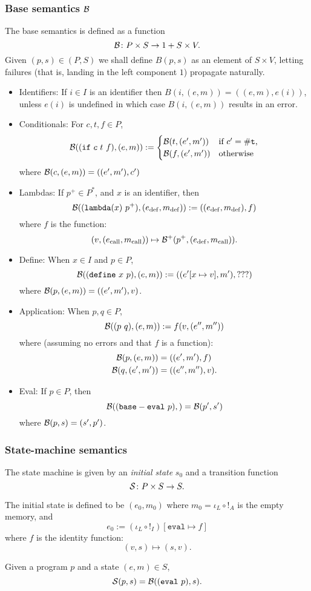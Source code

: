 \subsubsection{Base semantics $\B$}

The base semantics is defined as a function
\[
\B \colon P \times S \to 1 + S \times V.
\]
Given $(p,s) \in (P,S)$ we shall define $B(p,s)$ as an element of $S \times V$,
letting failures (that is, landing in the left component $1$) propagate
naturally.
\begin{itemize}
\item Identifiers: If $i \in I$ is an identifier then $B(i,(e,m)) = ((e,m),
  e(i))$, unless $e(i)$ is undefined in which case $B(i, (e,m))$ results in an
  error.
\item Conditionals: For $c,t,f \in P$,
  \[
    \B( (\mathtt{if} \ c \ t \ f), (e,m)) :=
    \begin{cases}
      \B(t, (e', m')) & \text{if $c' = \mathtt{\#t}$,}\\
      \B(f, (e', m')) & \text{otherwise}
    \end{cases}
  \]
  where $\B(c, (e,m)) = ((e',m'), c')$
\item
  \def\defe{\mathrm{def}}
  \def\calle{\mathrm{call}}
  \def\rete{\mathrm{rete}}
  Lambdas: If $p^+ \in P^*$, and $x$ is an identifier, then
  \[
    \B((\mathtt{lambda} (x) \ p^+), (e_\defe,m_\defe)) :=
    ((e_\defe,m_\defe), f)
  \]
  where $f$ is the function:
  \[
    (v, (e_\calle,m_\calle)) \mapsto \B^+(p^+, (e_\defe, m_\calle)).
  \]
\item Define: When $x \in I$ and $p \in P$,
\[
\B((\mathtt{define} \ x \ p), (e,m)) := ((e'[x \mapsto v], m'), ???)
\]
where $\B(p, (e,m)) = ((e', m'), v)$.
\item Application: When $p,q \in P$,
  \[
\B((p \ q), (e,m)) := f(v, (e'',m''))
\]
where (assuming no errors and that $f$ is a function):
\begin{align*}
  \B(p, (e,m)) &= ((e',m'), f)\\
  \B(q, (e',m')) &= ((e'',m''), v).
\end{align*}
\item
  Eval:
  If $p \in P$, then
  \[
    \B((\mathtt{base-eval} \ p), ) = \B(p', s')
  \]
  where $\B(p,s) = (s', p')$.
\end{itemize}

\subsubsection{State-machine semantics}
The \rad state machine is given by an \emph{initial state} $s_0$ and a
transition function
\[
  \S \colon P \times S \to S.
\]

The initial state is defined to be $(e_0,m_0)$ where $m_0 = \iota_L \circ !_A$
is the empty memory, and
\[
  e_0 := (\iota_L \circ !_I)[\mathtt{eval} \mapsto f]
\]
where $f$ is the identity function:
\[
  (v,s) \mapsto (s,v).
\]

Given a program $p$ and a state $(e,m) \in S$,
\[
\S(p,s) = \B( (\mathtt{eval} \ p), s).
\]
